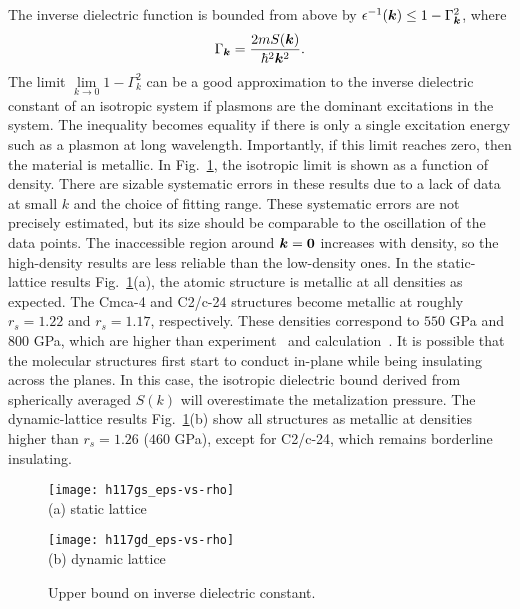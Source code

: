 The inverse dielectric function is bounded from above by $\epsilon^{-1}(\boldsymbol{k}) \le 1-\Gamma_{\boldsymbol{k}}^2$, where
\begin{align}
\Gamma_{\boldsymbol{k}} = \dfrac{2m S(\boldsymbol{k})}{\hbar^2 \boldsymbol{k}^2}.
\end{align}
The limit $\lim\limits_{k\rightarrow0} 1-\Gamma_k^2$ can be a good approximation to the inverse dielectric constant of an isotropic system if plasmons are the dominant excitations in the system.
The inequality becomes equality if there is only a single excitation energy such as a plasmon at long wavelength.
Importantly, if this limit reaches zero, then the material is metallic.
In Fig.~\ref{fig:hsolid-epsinv}, the isotropic limit is shown as a function of density.
There are sizable systematic errors in these results due to a lack of data at small $k$ and the choice of fitting range.
These systematic errors are not precisely estimated, but its size should be comparable to the oscillation of the data points.
The inaccessible region around $\boldsymbol{k}=\boldsymbol{0}$ increases with density, so the high-density results are less reliable than the low-density ones.
In the static-lattice results Fig.~\ref{fig:hsolid-epsinv}(a), the atomic structure is metallic at all densities as expected.
The Cmca-4 and C2/c-24 structures become metallic at roughly $r_s=1.22$ and $r_s=1.17$, respectively. These densities correspond to $550$ GPa and $800$ GPa, which are higher than experiment~\cite{Loubeyre2020} and calculation~\cite{Gorelov2019}.
It is possible that the molecular structures first start to conduct in-plane while being insulating across the planes.
In this case, the isotropic dielectric bound derived from spherically averaged $S(k)$ will overestimate the metalization pressure.
The dynamic-lattice results Fig.~\ref{fig:hsolid-epsinv}(b) show all structures as metallic at densities higher than $r_s=1.26$ ($460$ GPa), except for C2/c-24, which remains borderline insulating.

\begin{figure}[h]
\centering
\begin{minipage}{0.49\textwidth}
\centering
\texttt{[image: h117gs\_eps-vs-rho]}\\
(a) static lattice
\end{minipage}
\begin{minipage}{0.49\textwidth}
\centering
\texttt{[image: h117gd\_eps-vs-rho]}\\
(b) dynamic lattice
\end{minipage}
\caption{Upper bound on inverse dielectric constant.}
\label{fig:hsolid-epsinv}
\end{figure}

